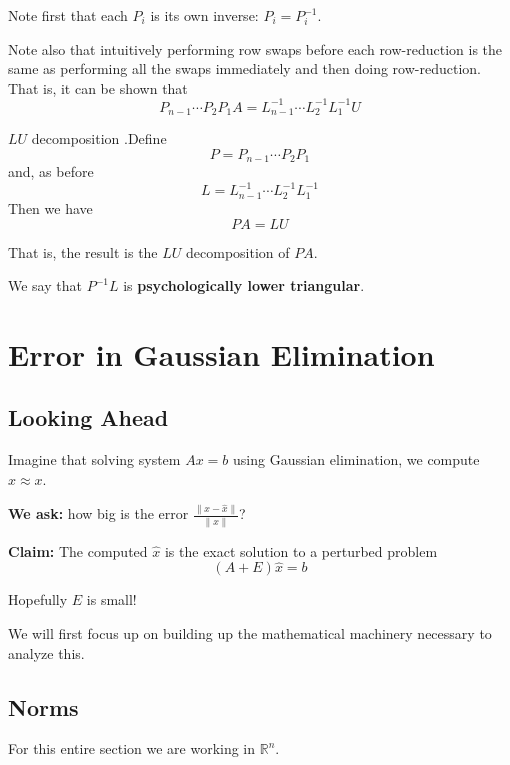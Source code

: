 \documentclass[12pt,letterpaper]{article}
\newcommand{\R}{\mathbb{R}}
\begin{document}
Note first that each $P_i$ is its own inverse: $P_i = P_i^{-1}$.

Note also that intuitively performing row swaps before each row-reduction is the same as performing all the swaps immediately and then doing row-reduction. That is, it can be shown that
\begin{equation}
	P_{n-1} \cdots P_2 P_1 A = L_{n-1}^{-1} \cdots L_2^{-1} L_1^{-1} U
\end{equation}
\begin{defn}{$LU$ decomposition}
.Define
\begin{equation}
	P = P_{n-1} \cdots P_2 P_1
\end{equation}
and, as before
\begin{equation}
	L = L_{n-1}^{-1} \cdots L_2^{-1} L_1^{-1}
\end{equation}
Then we have
\begin{equation}
	PA = LU
\end{equation}
\label{defn:LU_decomp}
\end{defn}

That is, the result is the $LU$ decomposition of $PA$.

We say that $P^{-1}L$ is \textbf{psychologically lower triangular}.


\section{Error in Gaussian Elimination}
\subsection{Looking Ahead}
Imagine that solving system $Ax = b$ using Gaussian elimination, we compute $\hat{x} \approx x$.

\textbf{We ask:} how big is the error $\frac{\lVert x - \hat{x} \rVert}{\lVert x \rVert}$?

\textbf{Claim:} The computed $\hat{x}$ is the exact solution to a perturbed problem
\begin{equation} \label{eq:perturbed}
	(A+E)\hat{x} = b
\end{equation}

Hopefully $E$ is small!

We will first focus up on building up the mathematical machinery necessary to analyze this.

\subsection{Norms}
For this entire section we are working in $\R^n$.
\end{document}
